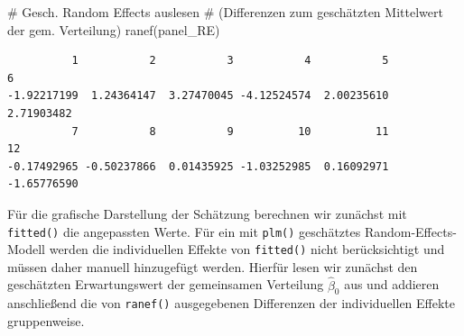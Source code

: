 \documentclass[
  a4paper,
  DIV=11,
  oneside]{scrreprt}
\newenvironment{Shaded}{\begin{snugshade}}{\end{snugshade}}
\newcommand{\AttributeTok}[1]{\textcolor[rgb]{0.40,0.45,0.13}{#1}}
\newcommand{\CommentTok}[1]{\textcolor[rgb]{0.37,0.37,0.37}{#1}}
\newcommand{\DecValTok}[1]{\textcolor[rgb]{0.68,0.00,0.00}{#1}}
\newcommand{\FunctionTok}[1]{\textcolor[rgb]{0.28,0.35,0.67}{#1}}
\newcommand{\NormalTok}[1]{\textcolor[rgb]{0.00,0.23,0.31}{#1}}
\newcommand{\OtherTok}[1]{\textcolor[rgb]{0.00,0.23,0.31}{#1}}
\newcommand{\SpecialCharTok}[1]{\textcolor[rgb]{0.37,0.37,0.37}{#1}}
\begin{document}
\begin{Shaded}
\begin{Highlighting}[]
\CommentTok{\# Gesch. Random Effects auslesen}
\CommentTok{\# (Differenzen zum geschätzten Mittelwert der gem. Verteilung)}
\FunctionTok{ranef}\NormalTok{(panel\_RE)}
\end{Highlighting}
\end{Shaded}

\begin{verbatim}
          1           2           3           4           5           6 
-1.92217199  1.24364147  3.27470045 -4.12524574  2.00235610  2.71903482 
          7           8           9          10          11          12 
-0.17492965 -0.50237866  0.01435925 -1.03252985  0.16092971 -1.65776590 
\end{verbatim}

Für die grafische Darstellung der Schätzung berechnen wir zunächst mit
\texttt{fitted()} die angepassten Werte. Für ein mit \texttt{plm()}
geschätztes Random-Effects-Modell werden die individuellen Effekte von
\texttt{fitted()} nicht berücksichtigt und müssen daher manuell
hinzugefügt werden. Hierfür lesen wir zunächst den geschätzten
Erwartungswert der gemeinsamen Verteilung \(\widehat{\beta}_0\) aus und
addieren anschließend die von \texttt{ranef()} ausgegebenen Differenzen
der individuellen Effekte gruppenweise.

\begin{Shaded}
\end{Shaded}
\end{document}
